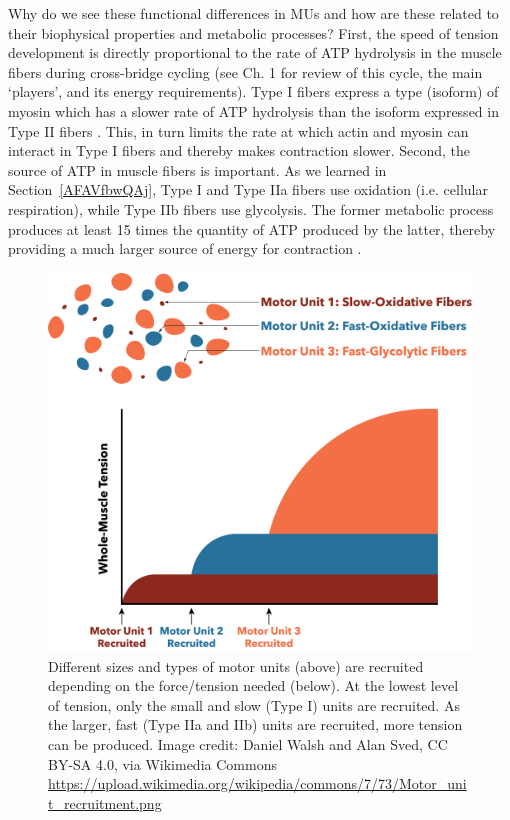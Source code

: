 \documentclass{article}
\begin{document}
Why do we see these functional differences in MUs and how are these related to their biophysical properties and metabolic processes? First, the speed of tension development is directly proportional to the rate of ATP hydrolysis in the muscle fibers during cross-bridge cycling (see Ch. 1 for review of this cycle, the main `players', and its energy requirements). Type I fibers express a type (isoform) of myosin which has a slower rate of ATP hydrolysis than the isoform expressed in Type II fibers \citep{biga} . This, in turn limits the rate at which actin and myosin can interact in Type I fibers and thereby makes contraction slower. Second, the source of ATP in muscle fibers is important. As we learned in Section~\ref{AFAVfbwQAj}, Type I and Type IIa fibers use oxidation (i.e. cellular respiration), while Type IIb fibers use glycolysis. The former metabolic process produces at least 15 times the quantity of ATP produced by the latter, thereby providing a much larger source of energy for contraction \citep{biava}.

\begin{figure}[!htbp]
\centering
\includegraphics[width=0.7\linewidth]{files/EPpXta8zJdzN048lz8AR-6c5448b34ae723d7ef83e4bd325a35f6.png}
\caption[]{Different sizes and types of motor units (above) are recruited depending on the force/tension needed (below). At the lowest level of tension, only the small and slow (Type I) units are recruited. As the larger, fast (Type IIa and IIb) units are recruited, more tension can be produced. Image credit: Daniel Walsh and Alan Sved, CC BY-SA 4.0, via Wikimedia Commons \href{https://upload.wikimedia.org/wikipedia/commons/7/73/Motor\_unit\_recruitment.png}{https://upload.wikimedia.org/wikipedia/commons/7/73/Motor\_unit\_recruitment.png}}
\label{jSKUh8ycDq}
\end{figure}
\end{document}

